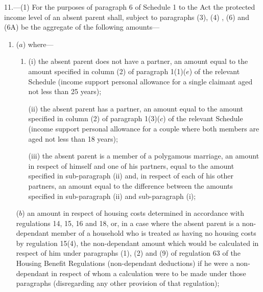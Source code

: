 \documentclass[12pt,a4paper]{article}
\begin{document}
11.—(1) For the purposes of paragraph 6 of Schedule 1 to the Act the protected income level of an absent parent shall, 
subject to paragraphs (3), (4)%
  , (6) and (6A)  %
be the aggregate of the following amounts—
\begin{enumerate}\item[]
($a$) where—
\begin{enumerate}\item[]
(i) the absent parent does not have a partner, an amount equal to the amount specified in column (2) of paragraph 1(1)($e$) of the relevant Schedule (income support personal allowance for a single claimant aged not less than 25 years);

(ii) the absent parent has a partner, an amount equal to the amount specified in column (2) of paragraph 1(3)($c$) of the relevant Schedule (income support personal allowance for a couple where both members are aged not less than 18 years);

(iii) the absent parent is a member of a polygamous marriage, an amount in respect of himself and one of his partners, equal to the amount specified in sub-paragraph (ii) and, in respect of each of his other partners, an amount equal to the difference between the amounts specified in sub-paragraph (ii) and sub-paragraph (i);
\end{enumerate}

($b$) an amount in respect of housing costs determined in accordance with regulations 14, 15, 16 and 18, or, in a case where the absent parent is a non-dependant member of a household who is treated as having no housing costs by 
regulation 15(4),  %
the non-dependant amount which would be calculated in respect of him under 
paragraphs (1), (2) and (9) of regulation 63 of the Housing Benefit Regulations (non-dependant deductions) if he were a non-dependant in respect of whom a calculation were to be made under those paragraphs (disregarding any other provision of that regulation);  %



\end{enumerate}
\end{document}
